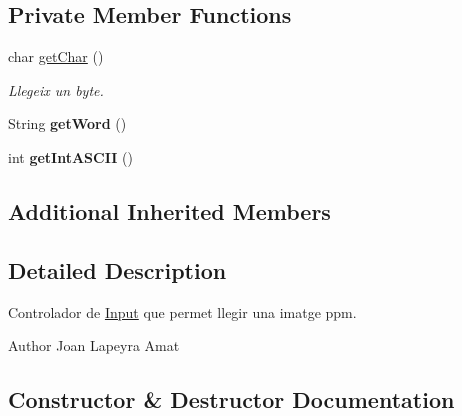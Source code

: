 \subsection*{Private Member Functions}
\begin{DoxyCompactItemize}
\item 
char \hyperlink{classpersistencia_1_1input_1_1Ctrl__Input__Img_a85a204b05c118b07d403e9b59d7f18c0}{get\+Char} ()
\begin{DoxyCompactList}\small\item\em Llegeix un byte. \end{DoxyCompactList}\item 
\mbox{\label{classpersistencia_1_1input_1_1Ctrl__Input__Img_a4219a110d7d84e7b883ffd88e18a0def}} 
String {\bfseries get\+Word} ()
\item 
\mbox{\label{classpersistencia_1_1input_1_1Ctrl__Input__Img_a430158ff229038ddc3476d406239f4cd}} 
int {\bfseries get\+Int\+A\+S\+C\+II} ()
\end{DoxyCompactItemize}
\subsection*{Additional Inherited Members}


\subsection{Detailed Description}
Controlador de \hyperlink{classpersistencia_1_1input_1_1Input}{Input} que permet llegir una imatge ppm. 

\begin{DoxyAuthor}{Author}
Joan Lapeyra Amat 
\end{DoxyAuthor}


\subsection{Constructor \& Destructor Documentation}
\mbox{\label{classpersistencia_1_1input_1_1Ctrl__Input__Img_a79318a62df31dfd107554e92e29f6d9a}} 
